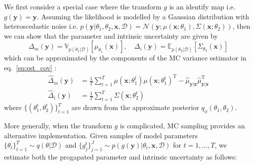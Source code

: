 We first consider a special case where the transform $g$ is an identify map i.e. $g(\mathbf{y})=\mathbf{y}$. Assuming the likelihood is modelled by a Gaussian distribution with heteroscedastic noise i.e. $p(\mathbf{y}|\theta_1, \theta_2, \mathbf{x},\mathcal{D}) = \mathcal{N}(\mathbf{y}; \mu(\mathbf{x};\theta_1),\Sigma(\mathbf{x};\theta_2))$, then we can show that the parameter and intrinsic uncertainty are given by
\begin{equation}
\Delta_{m}(\mathbf{y}) = \mathbb{V}_{p(\theta_{1}|\mathcal{D})}[\mu_{\theta_1}(\mathbf{x})], \quad \Delta_{i}(\mathbf{y})  =  \mathbb{E}_{p(\theta_{2}|\mathcal{D})}[\Sigma_{\theta_2}(\mathbf{x})]
\end{equation}
which can be approximated by the components of the MC variance estimator in eq.~\eqref{eq:est_cov} :
\begin{align}\label{eq:sampler_mean}
\widehat{\Delta}_{m}(\mathbf{y})  &=\frac{1}{T} \sum_{t=1}^T\mu(\mathbf{x};\theta_1^t)\mu(\mathbf{x};\theta_1^t)^{\text{T}} -\hat{\mu}_{\mathbf{y}|\mathbf{x}} \hat{\mu}_{\mathbf{y}|\mathbf{x}}^{\text{T}}\\ 
\widehat{\Delta}_{i}(\mathbf{y})  &= \frac{1}{T} \sum_{t=1}^T\Sigma(\mathbf{x};\theta_{2}^{t}) \label{eq:sampler_var}
\end{align}
where $\{(\theta^t_1,\theta^t_2)\}_{t=1}^T$ are drawn from the approximate posterior $q_{\phi}(\theta_1, \theta_{2})$. %


More generally, when the transform $g$ is complicated, MC sampling provides an alternative implementation. Given samples of model parameters $\{\theta_{t}\}_{t=1}^{T} \sim q(\theta|\mathcal{D})$ and $\{g^{t}_{j}\}_{j=1}^J \sim p(g(\mathbf{y})|\theta_{t},\mathbf{x},\mathcal{D})$ for $t=1, ...,T$,  we estimate both the progapated parameter and intrinsic uncertainty as follows:


